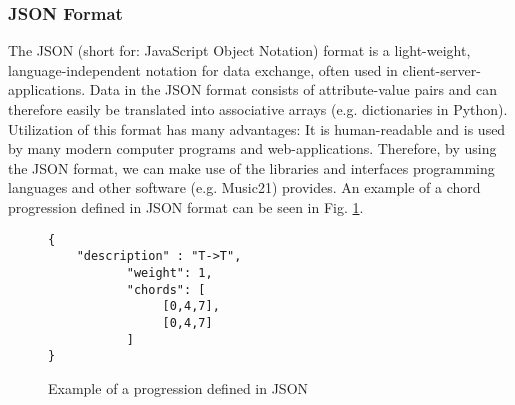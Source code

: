 \subsubsection{JSON Format}
The JSON (short for: JavaScript Object Notation) format \cite{json} is a light-weight, language-independent notation for data exchange, often used in client-server-applications. Data in the JSON format consists of attribute-value pairs and can therefore easily be translated into associative arrays (e.g. dictionaries in Python). Utilization of this format has many advantages: It is human-readable and is used by many modern computer programs and web-applications. Therefore, by using the JSON format, we can make use of the libraries and interfaces programming languages and other software (e.g. Music21) provides. An example of a chord progression defined in JSON format can be seen in Fig. \ref{fig:jsonex}.

\begin{figure}
\centering
\begin{lstlisting}[frame=single]
{
	"description" : "T->T",
           "weight": 1,
           "chords": [
                [0,4,7],
                [0,4,7]
           ]
}
\end{lstlisting}
\caption{Example of a progression defined in JSON}
\label{fig:jsonex}
\end{figure}